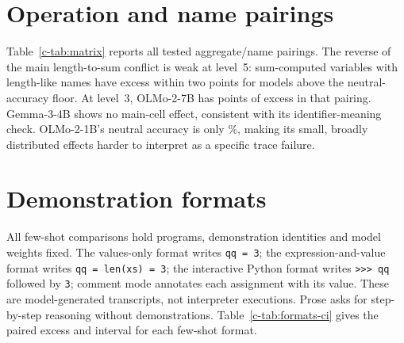 \section{Operation and name pairings}
\label{c-app:matrix}
\begin{table}[t]
\centering\small

\caption{Full level-5 panel: ordinary-name final-answer accuracy (\%) and excess name errors (points).
Direct contrasts rename the returned variable; trace contrasts rename the first assignment.
Trace columns include 95\% intervals. Stars mark consistent signs and intervals excluding zero.}
\label{c-tab:full-panel}
\end{table}

Table~\ref{c-tab:matrix} reports all tested aggregate/name pairings. The reverse of the main
length-to-sum conflict is weak at level~5: sum-computed variables with length-like names have
excess within two points for models above the neutral-accuracy floor. At level~3, OLMo-2-7B has
 points of excess in that pairing.
Gemma-3-4B shows no main-cell effect, consistent with its identifier-meaning check. OLMo-2-1B's
neutral accuracy is only \%, making its small, broadly distributed effects
harder to interpret as a specific trace failure.


\begin{table}[t]
\centering\small

\caption{Excess name errors at the aggregate step, trace regime, level 3 / level 5, three
sets of worked examples pooled; $^{*}$ as in Table~\ref{c-tab:full-panel}.}
\label{c-tab:matrix}
\end{table}

\section{Demonstration formats}
\begin{table}[t]
\centering\small

\caption{Code format comparison: added sum writes (points). Dashes: untested.}
\label{tab:formats}\label{c-tab:formats}
\end{table}

\label{c-app:formats}

All few-shot comparisons hold programs, demonstration identities and model weights fixed.
The values-only format writes \texttt{qq = 3}; the expression-and-value format writes
\texttt{qq = len(xs) = 3}; the interactive Python format writes
\texttt{>{}>{}> qq} followed by \texttt{3}; comment mode annotates each assignment with its
value. These are model-generated transcripts, not interpreter executions. Prose asks for step-by-step reasoning without demonstrations. Table~\ref{c-tab:formats-ci}
gives the paired excess and interval for each few-shot format.

